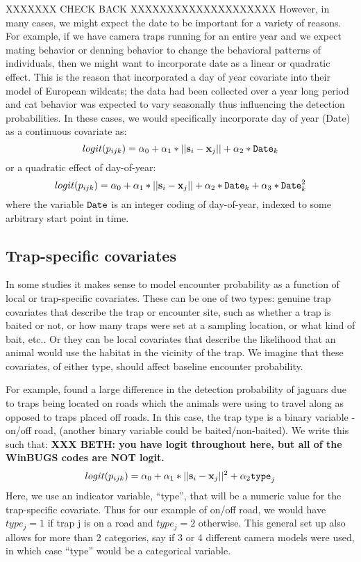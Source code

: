 XXXXXXX CHECK BACK XXXXXXXXXXXXXXXXXXXX 
However, in many cases, we might expect the date to be important for a
variety of reasons.  For example, if we have camera traps running for
an entire year and we expect mating behavior or denning behavior to
change the behavioral patterns of individuals, then we might want to incorporate
date as a linear or quadratic effect.  This is the reason that
\citet{kery_etal:2011} incorporated a day of year covariate into their
model of European wildcats; the data had been collected over a year
long period and cat behavior was expected to vary seasonally thus
influencing the detection probabilities.  In these cases, we would
specifically incorporate day of year (Date) as a continuous covariate
as:
\[
logit(p_{ijk}) = \alpha_0 + \alpha_1*||{\bf s}_{i}-{\bf x}_{j}|| + \alpha_2*\mbox{\tt Date}_{k}
\]
or a quadratic effect of day-of-year:
\[
logit(p_{ijk}) = \alpha_0 + \alpha_1*||{\bf s}_{i}-{\bf x}_{j}|| +
\alpha_2*\mbox{\tt Date}_{k}
 + \alpha_3*\mbox{\tt Date}_{k}^{2}
\]
where the variable $\mbox{\tt Date}$ is an integer coding of
day-of-year, indexed to some arbitrary start point in time.

\subsection{Trap-specific covariates}

In some studies it makes sense to model encounter probability as a
function of local or trap-specific covariates. These can be one of two
types: genuine trap covariates that describe the trap or encounter site,
such as whether a trap is baited or not, or how many traps were set at a sampling location,
or what kind of bait, etc.. Or they can be local covariates that
describe the likelihood that an animal would use the habitat in the
vicinity of the trap.
We imagine that these covariates, of either type, should affect
baseline encounter probability.

For example, \citet{sollmann_etal:2011}
found a large difference in the detection probability of jaguars due to traps
being located on roads which the animals were using to travel along as
opposed to traps placed off roads.  In this case, the trap
type is a binary variable - on/off road,
(another binary variable could be baited/non-baited).  We write this such that:
{\bf 
XXX BETH: you have logit throughout here, but all of the WinBUGS codes
are NOT logit.
}
\[
logit(p_{ijk}) = \alpha_{0} + \alpha_1*||{\bf s}_{i}-{\bf x}_{j}||^{2}
+ \alpha_{2} \mbox{\tt type}_{j}
\]
Here, we use an indicator variable, ``type'', that will be a numeric
value for the trap-specific covariate.  Thus for our example of on/off
road, we would have $type_j = 1$ if trap j is on a road and $type_j
= 2$ otherwise.  This general set up also allows for more than 2 categories,
say if 3 or 4 different camera models were used, in which case ``type'' would be a categorical variable.

